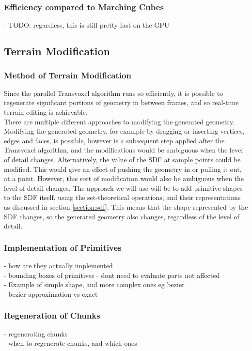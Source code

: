 \documentclass{article}
\begin{document}
\subsubsection{Efficiency compared to Marching Cubes}
- TODO: regardless, this is still pretty fast on the GPU\\

\subsection{Terrain Modification}
\subsubsection{Method of Terrain Modification}
Since the parallel Transvoxel algorithm runs so efficiently, it is possible to regenerate significant portions of geometry in between frames, and so real-time terrain editing is achievable.\\
There are multiple different approaches to modifying the generated geometry. Modifying the generated geometry, for example by dragging or inserting vertices, edges and faces, is possible, however is a subsequent step applied after the Transvoxel algorithm, and the modifications would be ambiguous when the level of detail changes. Alternatively, the value of the SDF at sample points could be modified. This would give an effect of pushing the geometry in or pulling it out, at a point. However, this sort of modification would also be ambiguous when the level of detail changes. The approach we will use will be to add primitive shapes to the SDF itself, using the set-theoretical operations, and their representations as discussed in section \ref{section:sdf}. This means that the shape represented by the SDF changes, so the generated geometry also changes, regardless of the level of detail.
\subsubsection{Implementation of Primitives}
 - how are they actually implemented\\
 - bounding boxes of primitives - dont need to evaluate parts not affected\\
 - Example of simple shape, and more complex ones eg bezier\\
 - bezier approximation vs exact\\
\subsubsection{Regeneration of Chunks}
 - regenerating chunks\\
 - when to regenerate chunks, and which ones\\
\end{document}
